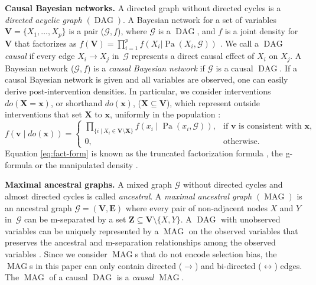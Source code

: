 \documentclass[11pt,a4paper]{article}
\DeclareMathOperator{\DAG}{DAG}
\DeclareMathOperator{\MAG}{MAG}
\DeclareMathOperator{\Pa}{Pa}
\newcommand{\vars}[1][V]{\mathbf{#1}}
\newcommand{\e}[1][E]{\mathbf{#1}}
\newcommand{\g}[1][G]{\mathcal{#1}}
\begin{document}
\textbf{Causal Bayesian networks.} A directed graph without directed cycles is a \emph{directed acyclic graph $(\DAG)$}. A Bayesian network for a set of variables $\vars=\{X_{1},\dots,X_{p}\}$ is a pair ($\g,f$), where $\g$ is a $\DAG$, and $f$ is a joint density for $\vars$ that factorizes as $f(\vars)= \prod_{i=1}^{p}f(X_{i}|\Pa(X_{i},\g))$ \citep{Pearl2009}. We call a $\DAG$ \emph{causal} if every edge $X_{i} \rightarrow X_{j}$ in~$\g$ represents a direct causal effect of $X_{i}$ on $X_{j}$. A Bayesian network ($\g,f$) is a \emph{causal Bayesian network} if $\g$ is a causal $\DAG$. If a causal Bayesian network is given and all variables are observed, one can easily derive post-intervention densities. In particular, we consider interventions $do(\mathbf{X=x})$, or shorthand $do(\mathbf{x})$, ($\mathbf{X}\subseteq \mathbf{V}$), which represent outside interventions that set $\mathbf{X}$ to $\mathbf{x}$, uniformly in the population \citep[see][]{Pearl2009}:
\begin{equation} \label{eq:fact-form}
f(\mathbf{v}\mid do(\mathbf{x})) =
\begin{cases}
\prod_{\{i \mid X_{i} \in \vars \setminus \mathbf{X}\}}f(x_{i}\mid\Pa(x_{i},\g)), &  \text{if }\mathbf{v} \text{ is consistent with }\mathbf{x,} \\
0, & \text{otherwise.}
\end{cases}
\end{equation}
Equation \eqref{eq:fact-form} is known as the truncated factorization formula \citep{Pearl2009}, the g-formula \citep{robins1986new} or the manipulated density \citep{spirtes2000causation}.

\textbf{Maximal ancestral graphs.}
A mixed graph $\g$ without directed cycles and almost directed cycles is called \textit{ancestral}. A \emph{maximal ancestral graph $(\MAG)$} is an ancestral graph $\g = (\vars, \e)$ where every pair of non-adjacent nodes $X$ and $Y$ in~$\g$ can be m-separated by a set $\mathbf{Z} \subseteq \vars \setminus \{X,Y\}$. A $\DAG$ with unobserved variables can be uniquely represented by a $\MAG$ on the observed variables that preserves the ancestral and m-separation relationships among the observed variables \citep[page~981~in][]{richardson2002ancestral}.  
Since we consider $\MAG$s that do not encode selection bias, the $\MAG$s in this paper can only contain directed ($\rightarrow$) and bi-directed ($\leftrightarrow$) edges.
The $\MAG$ of a causal $\DAG$ is a \emph{causal $\MAG$}.
\end{document}

